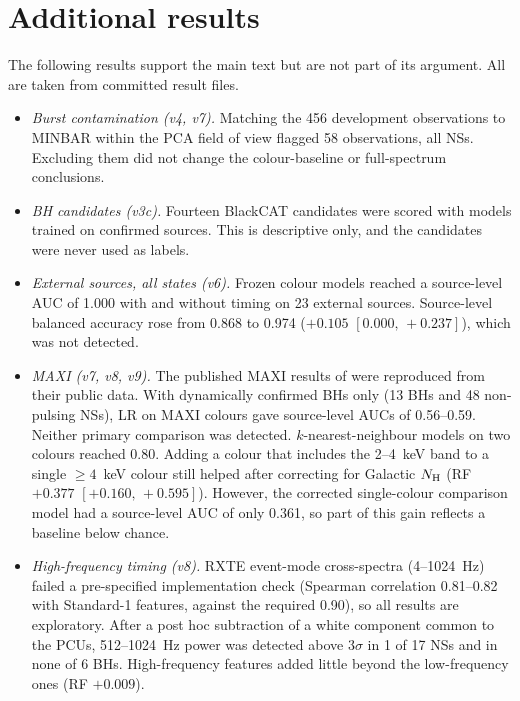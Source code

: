 \documentclass[11pt,a4paper]{article}
\newcommand{\ci}[2]{$[#1,\,#2]$}
\begin{document}
\section{Additional results}\label{app:extra}
The following results support the main text but are not part of its argument. All are taken from committed result files.
\begin{itemize}\setlength\itemsep{2pt}
\item \emph{Burst contamination (v4, v7).} Matching the 456 development observations to MINBAR within the PCA field of
view flagged 58 observations, all NSs. Excluding them did not change the colour-baseline or full-spectrum conclusions.
\item \emph{BH candidates (v3c).} Fourteen BlackCAT candidates were scored with models trained on confirmed sources. This
is descriptive only, and the candidates were never used as labels.
\item \emph{External sources, all states (v6).} Frozen colour models reached a source-level AUC of 1.000 with and
without timing on 23 external sources. Source-level balanced accuracy rose from 0.868 to 0.974 ($+0.105$
\ci{0.000}{+0.237}), which was not detected.
\item \emph{MAXI (v7, v8, v9).} The published MAXI results of \citet{deBeurs2022} were reproduced from their public
data. With dynamically confirmed BHs only (13 BHs and 48 non-pulsing NSs), LR on MAXI colours gave source-level AUCs of
0.56--0.59. Neither primary comparison was detected. $k$-nearest-neighbour models on two colours reached 0.80. Adding a
colour that includes the 2--4~keV band to a single $\geq4$~keV colour still helped after correcting for Galactic
$N_{\rm H}$ (RF $+0.377$ \ci{+0.160}{+0.595}). However, the corrected single-colour comparison model had a source-level AUC of only
0.361, so part of this gain reflects a baseline below chance.
\item \emph{High-frequency timing (v8).} RXTE event-mode cross-spectra (4--1024~Hz) failed a pre-specified
implementation check (Spearman correlation 0.81--0.82 with Standard-1 features, against the required 0.90), so all results are
exploratory. After a post hoc subtraction of a white component common to the PCUs, 512--1024~Hz power was detected
above $3\sigma$ in 1 of 17 NSs and in none of 6 BHs. High-frequency features added little beyond the low-frequency ones
(RF $+0.009$).
\end{itemize}
\end{document}
